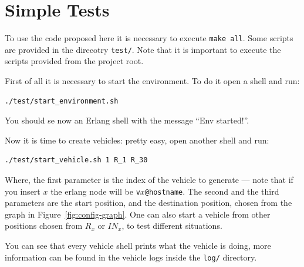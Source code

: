 \documentclass{memoir}
\begin{document}
\section{Simple Tests}
To use the code proposed here it is necessary to execute \texttt{make all}. Some scripts are provided in the direcotry \texttt{test/}. Note that it is important to execute the scripts provided from the project root.

First of all it is necessary to start the environment. To do it open a shell and run:
\begin{verbatim}
./test/start_environment.sh
\end{verbatim}
You should se now an Erlang shell with the message ``Env started!''.

Now it is time to create vehicles: pretty easy, open another shell and run:
\begin{verbatim}
./test/start_vehicle.sh 1 R_1 R_30
\end{verbatim}
Where, the first parameter is the index of the vehicle to generate --- note that if you insert $x$ the erlang node will be \verb|v|$x$\verb|@hostname|. The second and the third parameters are the start position, and the destination position, chosen from the graph in Figure~\ref{fig:config-graph}. One can also start a vehicle from other positions chosen from $R_x$ or $IN_x$, to test different situations.

You can see that every vehicle shell prints what the vehicle is doing, more information can be found in the vehicle logs inside the \texttt{log/} directory.
\end{document}
